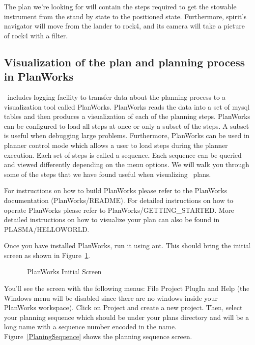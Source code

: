 \documentclass[10pt, letterpaper, twoside]{article}
\begin{document}
The plan we're looking for will contain the steps required to get the
stowable instrument from the stand by state to the positioned state.
Furthermore, spirit's navigator will move from the lander to rock4, and its
camera will take a picture of rock4 with a filter.



\subsection{Visualization of the plan and planning process in PlanWorks}
\label{visualization}
\ET\, includes logging facility to transfer data about the planning process
to a visualization tool called PlanWorks.  PlanWorks reads the data into a
set of mysql tables and then produces a visualization of each of the
planning steps. PlanWorks can be configured to load all steps at once or
only a subset of the steps.  A subset is useful when debugging large
problems. Furthermore, PlanWorks can be used in planner control mode which
allows a user to load steps during the planner execution.  Each set of
steps is called a sequence.  Each sequence can be queried and viewed
differently depending on the menu options.  We will walk you through some
of the steps that we have found useful when visualizing \ET\, plans.

For instructions on how to build PlanWorks please refer to the PlanWorks
documentation (PlanWorks/README).  For detailed instructions on how to
operate PlanWorks please refer to PlanWorks/GETTING\_STARTED.  More
detailed instructions on how to visualize your plan can also be found in
PLASMA/HELLOWORLD. 

Once you have installed PlanWorks, run it using ant.  This should bring the
initial screen as shown in Figure~\ref{PlanWorksInitial}.

\begin{figure}[htb]
\centering{}
\caption{\ET\, PlanWorks Initial Screen}
\label{PlanWorksInitial}
\end{figure}

You'll see the screen with the following menus: File Project PlugIn
and Help (the Windows menu will be disabled since there are no windows
inside your PlanWorks workspace).  Click on Project and create a new
project. Then, select your planning sequence which should be under your
plans directory and will be a long name with a sequence number encoded in
the name.  Figure~\ref{PlaningSequence} shows the planning sequence screen.
\end{document}

